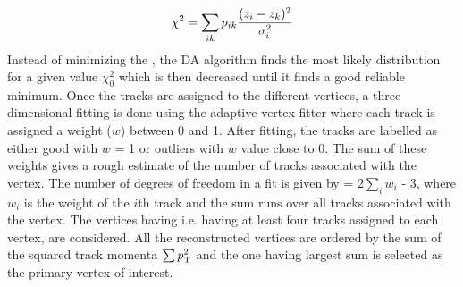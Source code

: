 \begin{equation}
\chisq = \sum\limits_{ik}^{} p_{ik} \frac{(z_i - z_k)^2}{\sigma^2_i} 
\end{equation} 
Instead of minimizing the \chisq, the DA algorithm finds the most likely distribution for a given value $\chi_{0}^{2}$ which is then decreased until it finds a good reliable minimum. Once the tracks are assigned to the different vertices, a three dimensional fitting is done using the adaptive vertex fitter \cite{Fruhwirth:2007hz} where each track is assigned a weight ($w$) between 0 and 1. After fitting, the tracks are labelled as either good with $w$ = 1 or outliers with $w$ value close to 0. The sum of these weights gives a rough estimate of the number of tracks associated with the vertex. The number of degrees of freedom in a fit is given by \ndof = 2$\sum\limits_i w_i$ - 3, where $w_i$ is the weight of the $i$th track and the sum runs over all tracks associated with the vertex. The vertices having \ndof {} i.e. having at least four tracks assigned to each vertex, are considered. All the reconstructed vertices are ordered by the sum of the squared track momenta $\sum p^2_{\rm T}$ and the one having largest sum is selected as the primary vertex of interest.

